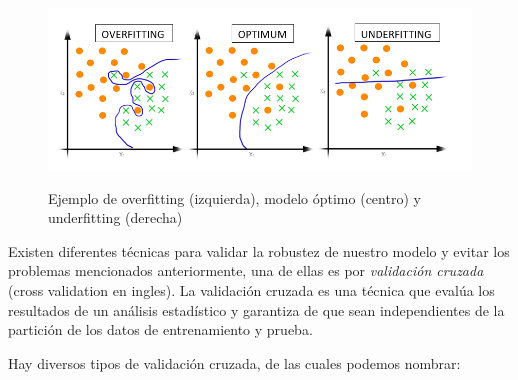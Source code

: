 \begin{figure}[h]
 \centering
  \includegraphics[height=5cm,keepaspectratio=true,clip=true]{imagenes/Logos/OverFUnderF.png}
  \caption{Ejemplo de overfitting (izquierda), modelo óptimo (centro) y underfitting (derecha)}
	\label{Fig: overUnder}
\end{figure}


Existen diferentes técnicas para validar la robustez de nuestro modelo y evitar los problemas mencionados anteriormente, una de ellas es por  \textit{validación cruzada} (cross validation en ingles). La validación cruzada es una técnica que evalúa los resultados de un análisis estadístico y garantiza de que sean independientes de la partición de los datos de entrenamiento y prueba. 

Hay diversos tipos de validación cruzada, de las cuales podemos nombrar:

